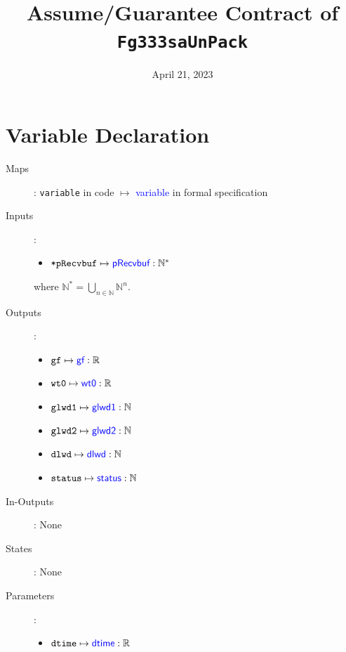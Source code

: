 \documentclass[fleqn,a4paper]{article}
\newcommand\var[1]{\texttt{#1}}
\newcommand\Var[1]{\textcolor{blue}{\textsf{#1}}}
\begin{document}
\title{Assume/Guarantee Contract of \texttt{Fg333saUnPack}}
\author{}

\date{April 21, 2023}

\maketitle

\section{Variable Declaration}

\begin{description}

\item[Maps]:
\var{variable} in code $\mapsto$ \Var{variable} in formal specification

\item[Inputs]:
\begin{itemize}
\item $\var{*pRecvbuf} \mapsto \Var{pRecvbuf} : \mathbb{N}^*$
\end{itemize}

where $\mathbb{N}^* = \bigcup_{n \in \mathbb{N}} \mathbb{N}^n$.

\item[Outputs]:
\begin{itemize}
\item $\var{gf} \mapsto \Var{gf} : \mathbb{R}$
\item $\var{wt0} \mapsto \Var{wt0} : \mathbb{R}$
\item $\var{glwd1} \mapsto \Var{glwd1} : \mathbb{N}$
\item $\var{glwd2} \mapsto \Var{glwd2} : \mathbb{N}$
\item $\var{dlwd} \mapsto \Var{dlwd} : \mathbb{N}$
\item $\var{status} \mapsto \Var{status} : \mathbb{N}$
\end{itemize}

\item[In-Outputs]: None

\item[States]: None

\item[Parameters]:
\begin{itemize}
\item $\var{dtime} \mapsto \Var{dtime} : \mathbb{R}$
\end{itemize}

\end{description}
\end{document}
